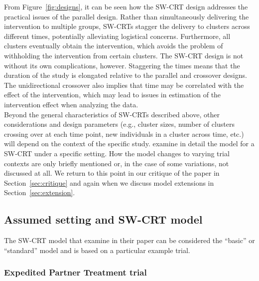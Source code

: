 \documentclass[10pt]{article}
\begin{document}
From Figure~\ref{fig:designs}, it can be seen how the SW-CRT design addresses the practical issues of the parallel design. Rather than simultaneously delivering the intervention to multiple groups, SW-CRTs stagger the delivery to clusters across different times, potentially alleviating logistical concerns. Furthermore, all clusters eventually obtain the intervention, which avoids the problem of withholding the intervention from certain clusters. The SW-CRT design is not without its own complications, however. Staggering the times means that the duration of the study is elongated relative to the parallel and crossover designs. The unidirectional crossover also implies that time may be correlated with the effect of the intervention, which may lead to issues in estimation of the intervention effect when analyzing the data.
\\

Beyond the general characteristics of SW-CRTs described above, other considerations and design parameters (e.g., cluster sizes, number of clusters crossing over at each time point, new individuals in a cluster across time, etc.) will depend on the context of the specific study. \citeauthor{Hussey:2007} examine in detail the model for a SW-CRT under a specific setting. How the model changes to varying trial contexts are only briefly mentioned or, in the case of some variations, not discussed at all. We return to this point in our critique of the paper in Section~\ref{sec:critique} and again when we discuss model extensions in Section~\ref{sec:extension}.

\subsection{Assumed setting and SW-CRT model}

The SW-CRT model that \textcite{Hussey:2007} examine in their paper can be considered the ``basic'' or ``standard'' model and is based on a particular example trial.

\subsubsection{Expedited Partner Treatment trial}
\end{document}
